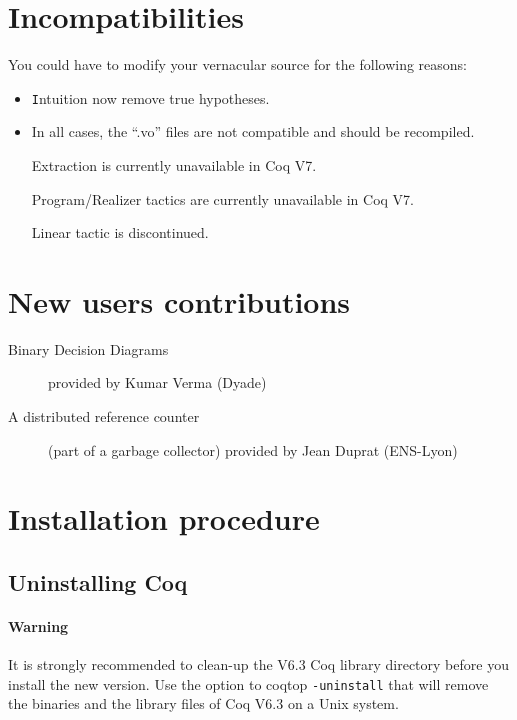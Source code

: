 \documentclass[11pt]{article}
\begin{document}
\section{Incompatibilities}
\label{Incompatibilities}

  You could have to modify your vernacular source for the following
  reasons:

  \begin{itemize}
 
  \item {\texttt Intuition} now remove true hypotheses.

  \item In all cases, the ``.vo'' files are not compatible and should
  be recompiled.

  \item[Extraction] is currently unavailable in Coq V7.

  \item[Program/Realizer] tactics are currently unavailable in Coq V7.

  \item[Linear] tactic is discontinued.

  \end{itemize}

\section{New users contributions}

  \begin{description}

  \item[Binary Decision Diagrams] provided by Kumar Verma (Dyade)

  \item[A distributed reference counter] (part of a
  garbage collector) provided by Jean Duprat (ENS-Lyon)

\end{description}

\section{Installation procedure}

\subsection{Uninstalling Coq}

\paragraph{Warning} 
It is strongly recommended to clean-up the V6.3 Coq library directory
before you install the new version.
Use the option to coqtop \texttt{-uninstall} that will remove
the binaries and the library files of Coq V6.3 on a Unix system.
\end{document}
